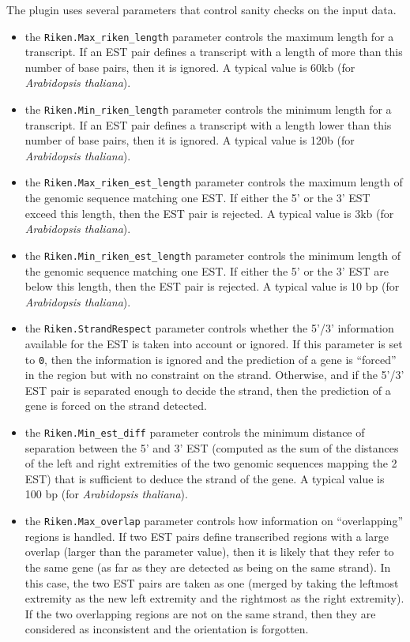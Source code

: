The plugin uses several parameters that control sanity
checks on the input data.
\begin{itemize}
\item the \texttt{Riken.Max\_riken\_length} parameter controls the
  maximum length for a transcript. If an EST pair defines a transcript
  with a length of more than this number of base pairs, then it is
  ignored. A typical value is 60kb (for \textit{Arabidopsis
    thaliana}).
\item the \texttt{Riken.Min\_riken\_length} parameter controls the
  minimum length for a transcript. If an EST pair defines a transcript
  with a length lower than this number of base pairs, then it is
  ignored. A typical value is 120b (for \textit{Arabidopsis
    thaliana}).
\item the \texttt{Riken.Max\_riken\_est\_length} parameter controls the
  maximum length of the genomic sequence matching one EST. If either
  the 5' or the 3' EST exceed this length, then the EST pair is
  rejected. A typical value is 3kb (for \textit{Arabidopsis
    thaliana}).
\item the \texttt{Riken.Min\_riken\_est\_length} parameter controls the
  minimum length of the genomic sequence matching one EST.  If either
  the 5' or the 3' EST are below this length, then the EST pair is
  rejected. A typical value is 10 bp (for \textit{Arabidopsis
    thaliana}).
\item the \texttt{Riken.StrandRespect} parameter controls whether the
  5'/3' information available for the EST is taken into account or
  ignored. If this parameter is set to \texttt{0}, then the
  information is ignored and the prediction of a gene is ``forced'' in
  the region but with no constraint on the strand.  Otherwise, and if
  the 5'/3' EST pair is separated enough to decide the strand, then
  the prediction of a gene is forced on the strand detected.
\item the \texttt{Riken.Min\_est\_diff} parameter controls the minimum
  distance of separation between the 5' and 3' EST (computed as the
  sum of the distances of the left and right extremities of the two
  genomic sequences mapping the 2 EST) that is sufficient to deduce
  the strand of the gene. A typical value is 100 bp (for
  \textit{Arabidopsis thaliana}).
\item the \texttt{Riken.Max\_overlap} parameter controls how
  information on ``overlapping'' regions is handled. If two EST pairs
  define transcribed regions with a large overlap (larger than the
  parameter value), then it is likely that they refer to the same gene
  (as far as they are detected as being on the same strand). In this
  case, the two EST pairs are taken as one (merged by taking the
  leftmost extremity as the new left extremity and the rightmost as
  the right extremity). If the two overlapping regions are not on the
  same strand, then they are considered as inconsistent and the
  orientation is forgotten.
  

\end{itemize}
